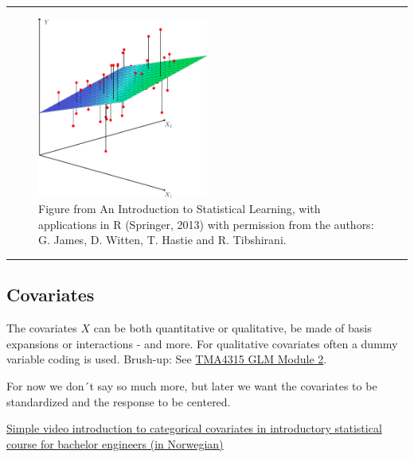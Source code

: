 \documentclass[
  letterpaper,
  DIV=11,
  numbers=noendperiod]{scrartcl}
\begin{document}
\begin{center}\rule{0.5\linewidth}{0.5pt}\end{center}

\begin{figure}

{\centering \includegraphics[width=0.5\textwidth,height=\textheight]{./ILS34.png}

}

\caption{Figure from An Introduction to Statistical Learning, with
applications in R (Springer, 2013) with permission from the authors: G.
James, D. Witten, T. Hastie and R. Tibshirani.}

\end{figure}

\begin{center}\rule{0.5\linewidth}{0.5pt}\end{center}

\hypertarget{covariates}{%
\subsection{Covariates}\label{covariates}}

The covariates \(X\) can be both quantitative or qualitative, be made of
basis expansions or interactions - and more. For qualitative covariates
often a dummy variable coding is used. Brush-up: See
\href{https://www.math.ntnu.no/emner/TMA4315/2018h/2MLR.html\#categorical_covariates_-_dummy_and_effect_coding}{TMA4315
GLM Module 2}.

For now we don´t say so much more, but later we want the covariates to
be standardized and the response to be centered.

\href{https://ntnu.cloud.panopto.eu/Panopto/Pages/Viewer.aspx?id=417d27bc-33c2-4cab-8a73-ac5801405bff}{Simple
video introduction to categorical covariates in introductory statistical
course for bachelor engineers (in Norwegian)}
\end{document}
